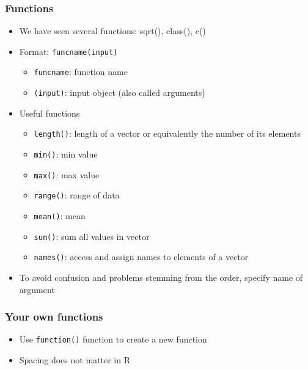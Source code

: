 \documentclass{beamer}
\begin{document}
\begin{frame}
 \frametitle<+->{Functions}
 \begin{itemize}
   \item We have seen several functions: sqrt(), class(), c()
   \item Format: {\tt funcname(input)}
     \begin{itemize}
       \item {\tt funcname}: function name
       \item {\tt (input)}: input object (also called arguments)
     \end{itemize}
   \item Useful functions
     \begin{itemize}
       \item {\tt length()}: length of a vector or equivalently the number of its elements
       \item {\tt min()}: min value
       \item {\tt max()}: max value
       \item {\tt range()}: range of data
       \item {\tt mean()}: mean
       \item {\tt sum()}: sum all values in vector
       \item {\tt names()}: access and assign names to elements of a vector
     \end{itemize}
   \item To avoid confusion and problems stemming from the order, specify name of argument
 \end{itemize}
\end{frame}

\begin{frame}
 \frametitle<+->{Your own functions}
 \begin{itemize}
   \item Use {\tt function()} function to create a new function
   \item Spacing does not matter in R
 \end{itemize}
\end{frame}
\end{document}
